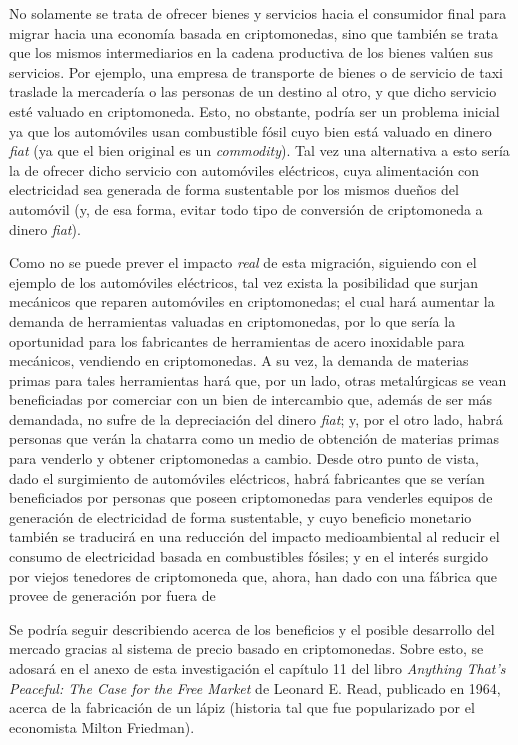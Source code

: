 \documentclass[12pt,a4paper,twoside]{book}
\begin{document}
No solamente se trata de ofrecer bienes y servicios hacia el consumidor final para migrar hacia una economía basada en criptomonedas, sino que también se trata que los mismos intermediarios en la cadena productiva de los bienes valúen sus servicios. Por ejemplo, una empresa de transporte de bienes o de servicio de taxi traslade la mercadería o las personas de un destino al otro, y que dicho servicio esté valuado en criptomoneda. Esto, no obstante, podría ser un problema inicial ya que los automóviles usan combustible fósil cuyo bien está valuado en dinero \textit{fiat} (ya que el bien original es un \textit{commodity}). Tal vez una alternativa a esto sería la de ofrecer dicho servicio con automóviles eléctricos, cuya alimentación con electricidad sea generada de forma sustentable por los mismos dueños del automóvil (y, de esa forma, evitar todo tipo de conversión de criptomoneda a dinero \textit{fiat}).

Como no se puede prever el impacto \textit{real} de esta migración, siguiendo con el ejemplo de los automóviles eléctricos, tal vez exista la posibilidad que surjan mecánicos que reparen automóviles en criptomonedas; el cual hará aumentar la demanda de herramientas valuadas en criptomonedas, por lo que sería la oportunidad para los fabricantes de herramientas de acero inoxidable para mecánicos, vendiendo en criptomonedas. A su vez, la demanda de materias primas para tales herramientas hará que, por un lado, otras metalúrgicas se vean beneficiadas por comerciar con un bien de intercambio que, además de ser más demandada, no sufre de la depreciación del dinero \textit{fiat}; y, por el otro lado, habrá personas que verán la chatarra como un medio de obtención de materias primas para venderlo y obtener criptomonedas a cambio. Desde otro punto de vista, dado el surgimiento de automóviles eléctricos, habrá fabricantes que se verían beneficiados por personas que poseen criptomonedas para venderles equipos de generación de electricidad de forma sustentable, y cuyo beneficio monetario también se traducirá en una reducción del impacto medioambiental al reducir el consumo de electricidad basada en combustibles fósiles; y en el interés surgido por viejos tenedores de criptomoneda que, ahora, han dado con una fábrica que provee de generación por fuera de 

Se podría seguir describiendo acerca de los beneficios y el posible desarrollo del mercado gracias al sistema de precio basado en criptomonedas. Sobre esto, se adosará en el anexo de esta investigación el capítulo 11 del libro \textit{Anything That's Peaceful: The Case for the Free Market} de Leonard E. Read, publicado en 1964, acerca de la fabricación de un lápiz (historia tal que fue popularizado por el economista Milton Friedman).
\end{document}
